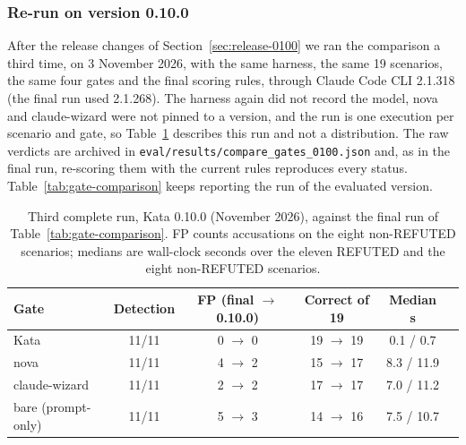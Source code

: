 \documentclass{sbc2019}%
\begin{document}
\subsubsection{Re-run on version 0.10.0}
\label{sec:exec-comparison-0100}

After the release changes of Section~\ref{sec:release-0100} we ran the
comparison a third time, on 3 November 2026, with the same harness, the same 19
scenarios, the same four gates and the final scoring rules, through Claude
Code CLI 2.1.318 (the final run used 2.1.268). The harness again did not
record the model, nova and claude-wizard were not pinned to a version, and
the run is one execution per scenario and gate, so Table~\ref{tab:gate-rerun}
describes this run and not a distribution. The raw verdicts are archived in
\texttt{eval/results/compare\_gates\_0100.json} and, as in the final run,
re-scoring them with the current rules reproduces every status. Table~\ref{tab:gate-comparison}
keeps reporting the run of the evaluated version.

\begin{table}[!ht]
\caption{Third complete run, Kata 0.10.0 (November 2026), against the final
run of Table~\ref{tab:gate-comparison}. FP counts accusations on the eight
non-REFUTED scenarios; medians are wall-clock seconds over the eleven REFUTED
and the eight non-REFUTED scenarios.}
\centering
\begin{tabular}{@{}lccccc@{}}
\hline\hline
Gate & Detection & FP (final $\rightarrow$ 0.10.0) & Correct of 19 & Median s \\
\hline
Kata & 11/11 & 0 $\rightarrow$ 0 & 19 $\rightarrow$ 19 & 0.1 / 0.7 \\
nova & 11/11 & 4 $\rightarrow$ 2 & 15 $\rightarrow$ 17 & 8.3 / 11.9 \\
claude-wizard & 11/11 & 2 $\rightarrow$ 2 & 17 $\rightarrow$ 17 & 7.0 / 11.2 \\
bare (prompt-only) & 11/11 & 5 $\rightarrow$ 3 & 14 $\rightarrow$ 16 & 7.5 / 10.7 \\
\hline\hline
\end{tabular}
\label{tab:gate-rerun}
\end{table}
\end{document}
